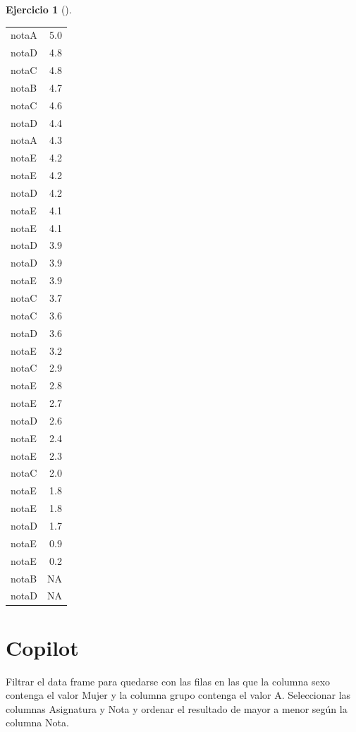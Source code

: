 \documentclass[
  a4paper,
]{scrreport}
\newenvironment{Shaded}{\begin{snugshade}}{\end{snugshade}}
\newcommand{\ExtensionTok}[1]{\textcolor[rgb]{0.00,0.23,0.31}{#1}}
\newcommand{\NormalTok}[1]{\textcolor[rgb]{0.00,0.23,0.31}{#1}}
\theoremstyle{definition}
\newtheorem{exercise}{Ejercicio}[chapter]
\theoremstyle{remark}
\begin{document}
\begin{exercise}[]
\begin{enumerate}
\begin{tcolorbox}
\begin{longtable}[]{@{}lr@{}}
  notaA & 5.0 \\
  notaD & 4.8 \\
  notaC & 4.8 \\
  notaB & 4.7 \\
  notaC & 4.6 \\
  notaD & 4.4 \\
  notaA & 4.3 \\
  notaE & 4.2 \\
  notaE & 4.2 \\
  notaD & 4.2 \\
  notaE & 4.1 \\
  notaE & 4.1 \\
  notaD & 3.9 \\
  notaD & 3.9 \\
  notaE & 3.9 \\
  notaC & 3.7 \\
  notaC & 3.6 \\
  notaD & 3.6 \\
  notaE & 3.2 \\
  notaC & 2.9 \\
  notaE & 2.8 \\
  notaE & 2.7 \\
  notaD & 2.6 \\
  notaE & 2.4 \\
  notaE & 2.3 \\
  notaC & 2.0 \\
  notaE & 1.8 \\
  notaE & 1.8 \\
  notaD & 1.7 \\
  notaE & 0.9 \\
  notaE & 0.2 \\
  notaB & NA \\
  notaD & NA \\
  \end{longtable}

  \section{Copilot}

\begin{Shaded}
\begin{Highlighting}[]
\ExtensionTok{Filtrar}\NormalTok{ el data frame para quedarse con las filas en las que la columna sexo contenga el valor Mujer y la columna grupo contenga el valor A. Seleccionar las columnas Asignatura y Nota y ordenar el resultado de mayor a menor según la columna Nota.}
\end{Highlighting}
\end{Shaded}

  \end{tcolorbox}
\end{enumerate}

\end{exercise}
\end{document}
